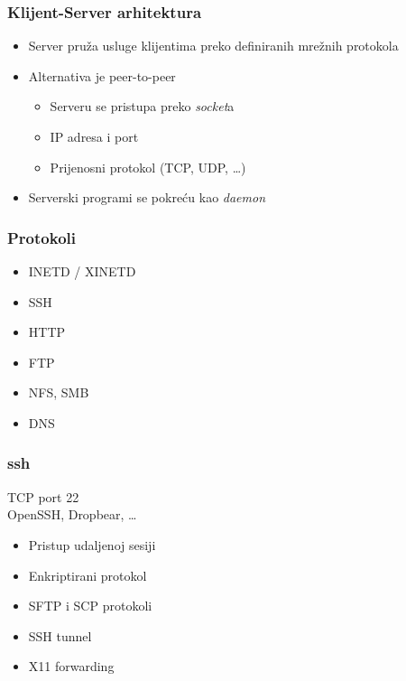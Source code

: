 \documentclass[t,table,usenames,dvipsnames]{beamer}
\begin{document}
\begin{frame}
    \frametitle{Klijent-Server arhitektura}
	\begin{itemize}
		\item Server pruža usluge klijentima preko definiranih mrežnih protokola
        \item Alternativa je peer-to-peer
		\begin{itemize}
			\item Serveru se pristupa preko \textit{socket}a
			\item[] IP adresa i port
			\item[] Prijenosni protokol (TCP, UDP, \ldots)
		\end{itemize}
		\item Serverski programi se pokreću kao \emph{daemon}
	\end{itemize}
\end{frame}


\begin{frame}
    \frametitle{Protokoli}
    \begin{itemize}
        \item INETD / XINETD 
        \item SSH
        \item HTTP
        \item FTP
        \item NFS, SMB
        \item DNS
    \end{itemize}
\end{frame}


\begin{frame}
	\frametitle{ssh}

	TCP port 22\\
	OpenSSH, Dropbear, \ldots

	\begin{itemize}
		\item Pristup udaljenoj sesiji
		\item Enkriptirani protokol
		
		\item SFTP i SCP protokoli
		\item SSH tunnel
		\item[] X11 forwarding
	\end{itemize}
\end{frame}
\end{document}
